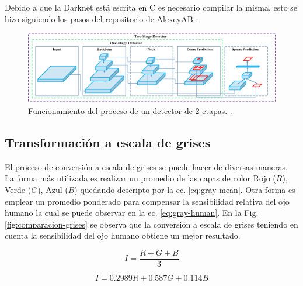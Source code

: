 Debido a que la Darknet está escrita en C es necesario compilar la misma, esto se hizo siguiendo los pasos del repositorio de AlexeyAB \cite{alexey_yolo_2023}.


\begin{figure}[bth]
    \centering
    \includegraphics[width=\textwidth]{imgs/funcionamiento-yolo.png}
    \caption{Funcionamiento del proceso de un detector de 2 etapas. \cite{bochkovskiy_yolov4_2020}.}
    \label{fig:funcionamiento-yolo}
\end{figure}

\subsection{Transformación a escala de grises}

El proceso de conversión a escala de grises se puede hacer de diversas maneras. La forma más utilizada es realizar un promedio de las capas de color Rojo ($R$), Verde ($G$), Azul ($B$) quedando descripto por la ec. \ref{eq:gray-mean}.
Otra forma es emplear un promedio ponderado para compensar la sensibilidad relativa del ojo humano la cual se puede observar en la ec. \ref{eq:gray-human}. En la Fig. \ref{fig:comparacion-grises} se observa que la conversión a escala de grises teniendo en cuenta la sensibilidad del ojo humano obtiene un mejor resultado.

\begin{equation}
    \label{eq:gray-mean}
    I = \frac{R + G + B}{3}
\end{equation}

\begin{equation}
    \label{eq:gray-human}
    I = 0.2989R + 0.587G + 0.114B
\end{equation}

